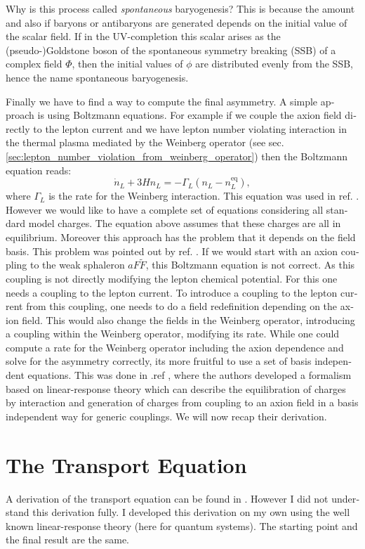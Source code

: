 \documentclass[master,       %
               twoside,        %
               BCOR10mm,       %
               english,ngerman, %
               ]{GAUBM}
\begin{document}
\begin{otherlanguage}{english}
Why is this process called \emph{spontaneous} baryogenesis?
This is because the amount and also if baryons or antibaryons are generated depends on the initial value of the scalar field.
If in the UV-completion this scalar arises as the (pseudo-)Goldstone boson of the spontaneous symmetry breaking (SSB) of a complex field $\Phi$, then the initial values of $\phi$ are distributed evenly from the SSB, hence the name spontaneous baryogenesis.

Finally we have to find a way to compute the final asymmetry.
A simple approach is using Boltzmann equations. For example if we couple
the axion field directly to the lepton current and we have lepton number violating interaction in the thermal plasma mediated by the Weinberg operator (see sec. \ref{sec:lepton_number_violation_from_weinberg_operator})
then the Boltzmann equation reads:
\begin{equation}
	\dot{n}_L + 3 H n_L = - \Gamma_L (n_L - n_L^\mathrm{eq}),
\end{equation}
where $\Gamma_L$ is the rate for the Weinberg interaction.
This equation was used in ref. \cite{Kusenko_2015_Axion_Leptogenesis}.
However we would like to have a complete set of equations considering all standard model charges. The equation above assumes that these charges are all in equilibrium.
Moreover this approach has the problem that it depends on the field basis.
This problem was pointed out by ref. \cite{Shi_2015_Basis_Invariance_chemical_equilibrium}.
If we would start with an axion coupling to the weak sphaleron $a F \tilde{F}$, this Boltzmann equation is not correct. As this coupling is not directly modifying the lepton chemical potential. For this one needs a coupling to the lepton current.
To introduce a coupling to the lepton current from this coupling, one needs to do a field redefinition depending on the axion field. This would also change the fields in the Weinberg operator, introducing a coupling within the Weinberg operator, modifying its rate. While one could compute a rate for the Weinberg operator including the axion dependence and solve for the asymmetry correctly, its more fruitful to use a set of basis independent equations.
This was done in .ref \cite{Domcke:2020kcp_Generic_Couplings}, where the authors developed a formalism based on linear-response theory which can describe the equilibration of charges by interaction and generation of charges from coupling to an axion field in a basis independent way for generic couplings. We will now recap their derivation.

\chapter{The Transport Equation}
\label{sec:transport_equation}
A derivation of the transport equation can be found in \cite[appendix B]{Domcke:2020kcp_Generic_Couplings}.
However I did not understand this derivation fully. I developed this derivation on my own using the well known linear-response theory (here for quantum systems).
The starting point and the final result are the same.


\end{otherlanguage}
\end{document}
